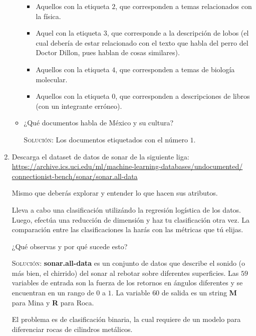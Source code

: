 \documentclass[letterpaper,11pt]{article}
\begin{document}
\begin{enumerate}
\begin{itemize}
\begin{itemize}
            \item Aquellos con la etiqueta $2$, que corresponden a temas 
            relacionados con la física.

            \item Aquel con la etiqueta $3$, que corresponde a la descripción 
            de lobos (el cual debería de estar relacionado con el texto que 
            habla del perro del Doctor Dillon, pues hablan de cosas similares).

            \item Aquellos con la etiqueta $4$, que corresponden a temas de 
            biología molecular.

            \item Aquellos con la etiqueta $0$, que corresponden a descripciones
            de libros (con un integrante erróneo).
        \end{itemize}

        \item ¿Qué documentos habla de México y su cultura?

        \textsc{Solución:} Los documentos etiquetados con el número $1$.
    \end{itemize}

    \item Descarga el dataset de datos de sonar de la siguiente liga:
    \url{https://archive.ics.uci.edu/ml/machine-learning-databases/undocumented/
    connectionist-bench/sonar/sonar.all-data}

    Mismo que deberás explorar y entender lo que hacen sus atributos. 
    
    Lleva a cabo una clasificación utilizándo la regresión logística de los 
    datos. Luego, efectúa una reducción de dimensión y haz tu clasificación 
    otra vez. La comparación entre las clasificaciones la harás con las 
    métricas que tú elijas. 

    ¿Qué observas y por qué sucede esto?

    \textsc{Solución:} \textbf{sonar.all-data} es un conjunto de datos que 
    describe el sonido (o más bien, el chirrido) del sonar al rebotar sobre 
    diferentes superficies. Las $59$ variables de entrada son la fuerza de los 
    retornos en ángulos diferentes y se encuentran en un rango de $0$ a $1$. La 
    variable $60$ de salida es un string \textbf{M} para Mina y \textbf{R} para 
    Roca.

    El problema es de clasificación binaria, la cual requiere de un modelo para 
    diferenciar rocas de cilindros metálicos.


\end{enumerate}
\end{document}
